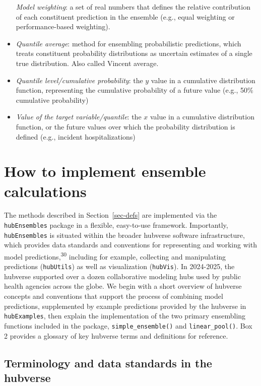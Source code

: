 \documentclass[
]{article}
\begin{document}
\begin{tcolorbox}
\begin{itemize}
  \emph{Model weighting}: a set of real numbers that defines the
  relative contribution of each constituent prediction in the ensemble
  (e.g., equal weighting or performance-based weighting).
\item
  \emph{Quantile average}: method for ensembling probabilistic
  predictions, which treats constituent probability distributions as
  uncertain estimates of a single true distribution. Also called Vincent
  average.
\item
  \emph{Quantile level/cumulative probability}: the \(y\) value in a
  cumulative distribution function, representing the cumulative
  probability of a future value (e.g., 50\% cumulative probability)
\item
  \emph{Value of the target variable/quantile}: the \(x\) value in a
  cumulative distribution function, or the future values over which the
  probability distribution is defined (e.g., incident hospitalizations)
\end{itemize}

\end{tcolorbox}

\section{How to implement ensemble
calculations}\label{sec-implementation}

The methods described in Section~\ref{sec-defs} are implemented via the
\texttt{hubEnsembles} package in a flexible, easy-to-use framework.
Importantly, \texttt{hubEnsembles} is situated within the broader
hubverse software infrastructure, which provides data standards and
conventions for representing and working with model
predictions,\textsuperscript{30} including for example, collecting and
manipulating predictions (\texttt{hubUtils}) as well as visualization
(\texttt{hubVis}). In 2024-2025, the hubverse supported over a dozen
collaborative modeling hubs used by public health agencies across the
globe. We begin with a short overview of hubverse concepts and
conventions that support the process of combining model predictions,
supplemented by example predictions provided by the hubverse in
\texttt{hubExamples}, then explain the implementation of the two primary
ensembling functions included in the package,
\texttt{simple\_ensemble()} and \texttt{linear\_pool()}. Box 2 provides
a glossary of key hubverse terms and definitions for reference.

\subsection{Terminology and data standards in the
hubverse}\label{terminology-and-data-standards-in-the-hubverse}
\end{document}
